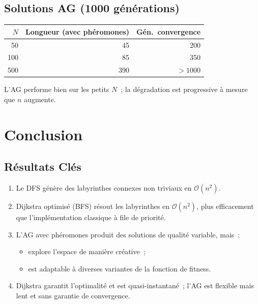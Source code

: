 \documentclass[12pt, a4paper]{article}
\theoremstyle{definition}
\theoremstyle{remark}
\newcommand{\bigO}[1]{\mathcal{O}\!\left(#1\right)}
\begin{document}
\subsection{Solutions AG (1000 générations)}

\begin{center}
\begin{tabular}{rrr}
    \toprule
    $N$ & Longueur (avec phéromones) & Gén.~convergence \\
    \midrule
    50  & 45  & 200    \\
    100 & 85  & 350    \\
    500 & 390 & $> 1000$ \\
    \bottomrule
\end{tabular}
\end{center}

L'AG performe bien sur les petits $N$~; la dégradation est progressive à mesure
que $n$ augmente.

\section{Conclusion}

\subsection{Résultats Clés}

\begin{enumerate}
    \item Le DFS génère des labyrinthes connexes non triviaux en $\bigO{n^2}$.
    \item Dijkstra optimisé (BFS) résout les labyrinthes en $\bigO{n^2}$,
          plus efficacement que l'implémentation classique à file de priorité.
    \item L'AG avec phéromones produit des solutions de qualité variable, mais~:
          \begin{itemize}[noitemsep]
              \item explore l'espace de manière créative~;
              \item est adaptable à diverses variantes de la fonction de fitness.
          \end{itemize}
    \item Dijkstra garantit l'optimalité et est quasi-instantané~;
          l'AG est flexible mais lent et sans garantie de convergence.
\end{enumerate}
\end{document}
